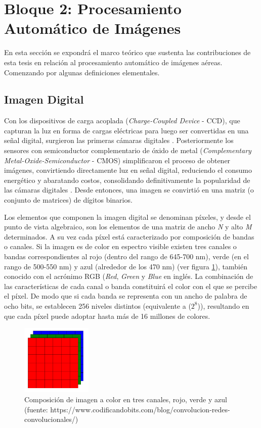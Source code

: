 \section{Bloque 2: Procesamiento Automático de Imágenes}

En esta sección se expondrá el marco teórico que sustenta las contribuciones de esta tesis en relación al procesamiento automático de imágenes aéreas. Comenzando por algunas definiciones elementales.

\subsection{Imagen Digital}
Con los dispositivos de carga acoplada (\textit{Charge-Coupled Device} - CCD), que capturan la luz en forma de cargas eléctricas para luego ser convertidas en una señal digital, surgieron las primeras cámaras digitales \cite{dyck_chapter_1982}. Posteriormente los sensores con semiconductor complementario de óxido de metal (\textit{Complementary Metal-Oxide-Semiconductor} - CMOS) simplificaron el proceso de obtener imágenes, convirtiendo directamente luz en señal digital, reduciendo el consumo energético y abaratando costos, consolidando definitivamente la popularidad de las cámaras digitales \cite{fossum_cmos_1997}. Desde entonces, una imagen se convirtió en una matriz (o conjunto de matrices) de dígitos binarios.

Los elementos que componen la imagen digital se denominan píxeles, y desde el punto de vista algebraico, son los elementos de una matriz de ancho \textit{N} y alto \textit{M} determinados. A su vez cada píxel está caracterizado por composición de bandas o canales. Si la imagen es de color en espectro visible existen tres canales o bandas correspondientes al rojo (dentro del rango de 645-700 nm), verde (en el rango de 500-550 nm) y azul (alrededor de los 470 nm) (ver figura \ref{RGB}), también conocido con el acrónimo RGB (\textit{Red}, \textit{Green} y \textit{Blue} en inglés. La combinación de las características de cada canal o banda constituirá el color con el que se percibe el píxel. De modo que si cada banda se representa con un ancho de palabra de ocho bits, se establecen 256 niveles distintos (equivalente a ($2^8$)), resultando en que cada píxel puede adoptar hasta más de 16 millones de colores.


\begin{figure}[h!]
    \includegraphics[width=0.3\textwidth]{Imagenes/imagen-a-color.png}
     \caption{Composición de imagen a color en tres canales, rojo, verde y azul (fuente: https://www.codificandobits.com/blog/convolucion-redes-convolucionales/)}
    \label{RGB}
\end{figure}

